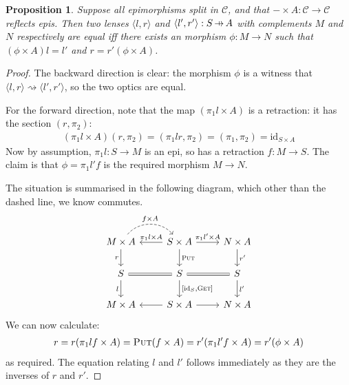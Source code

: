 \documentclass[11pt,a4paper]{article}
\theoremstyle{plain}
\newtheorem{proposition}[theorem]{Proposition}
\theoremstyle{definition}
\newcommand{\C}{\mathscr{C}}
\newcommand{\id}{\mathrm{id}}
\newcommand{\fget}{\textsc{Get}}
\newcommand{\fput}{\textsc{Put}}
\newcommand{\hto}{\ensuremath{\,\mathaccent\shortmid\rightarrow\,}}
\begin{document}
\begin{proposition}
Suppose all epimorphisms split in $\C$, and that $- \times A : \C \to \C$ reflects epis. Then two lenses $\langle l, r \rangle$ and $\langle l', r' \rangle :  S \hto A$ with complements $M$ and $N$ respectively are equal iff there exists an morphism $\phi : M \to N$ such that $(\phi \times A)l = l'$ and $r = r' (\phi \times A)$.
\end{proposition}
\begin{proof}
The backward direction is clear: the morphism $\phi$ is a witness that $\langle l, r \rangle \rightsquigarrow \langle l', r' \rangle$, so the two optics are equal.

For the forward direction, note that the map $(\pi_1 l \times A)$ is a retraction: it has the section $(r, \pi_2)$:
\begin{align*}
(\pi_1 l \times A)(r, \pi_2) = (\pi_1 l r, \pi_2) = (\pi_1, \pi_2) = \id_{S \times A}
\end{align*}
Now by assumption, $\pi_1 l : S \to M$ is an epi, so has a retraction $f : M \to S$. The claim is that $\phi = \pi_1 l' f$ is the required morphism $M \to N$.

The situation is summarised in the following diagram, which other than the dashed line, we know commutes.
\[
\begin{tikzcd}
M \times A \ar[r, "{f \times A}", dashed, bend left = 50] \ar[d, "r", swap] & S \times A \ar[d, "\fput"] \ar[r, "{\pi_1 l' \times A}"] \ar[l, "{\pi_1 l \times A}", swap] & N \times A \ar[d, "r'"] \\
S \ar[r, equal] \ar[d, "l", swap] & S \ar[d, "{[\id_S, \fget]}"] \ar[r, equal] & S \ar[d, "l'"] \\
M \times A & S \times A \ar[r] \ar[l] & N \times A
\end{tikzcd}
\]
We can now calculate:
\begin{align*}
r = r(\pi_1 l f \times A) = \fput (f \times A) = r' (\pi_1 l' f \times A) = r'(\phi \times A)
\end{align*}
as required. The equation relating $l$ and $l'$ follows immediately as they are the inverses of $r$ and $r'$.
\end{proof}
\end{document}
